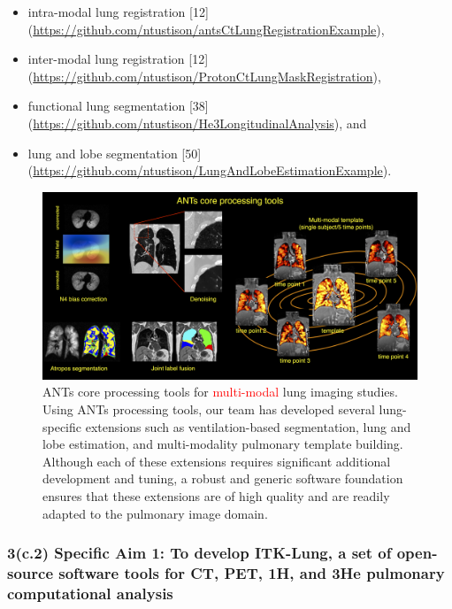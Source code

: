\documentclass[11pt,]{article}
\providecommand{\tightlist}{%
  \setlength{\itemsep}{0pt}\setlength{\parskip}{0pt}}
\begin{document}
\begin{itemize}
\tightlist
\item
  intra-modal lung registration {[}12{]}
  (\url{https://github.com/ntustison/antsCtLungRegistrationExample}),
\item
  inter-modal lung registration {[}12{]}
  (\url{https://github.com/ntustison/ProtonCtLungMaskRegistration}),
\item
  functional lung segmentation {[}38{]}
  (\url{https://github.com/ntustison/He3LongitudinalAnalysis}), and
\item
  lung and lobe segmentation {[}50{]}
  (\url{https://github.com/ntustison/LungAndLobeEstimationExample}).
\end{itemize}

\begin{figure}[htbp]
\centering
\includegraphics{Figs/coreANtsToolsLung.png}
\caption{ANTs core processing tools for \textcolor{red}{multi-modal}
lung imaging studies. Using ANTs processing tools, our team has
developed several lung-specific extensions such as ventilation-based
segmentation, lung and lobe estimation, and multi-modality pulmonary
template building. Although each of these extensions requires
significant additional development and tuning, a robust and generic
software foundation ensures that these extensions are of high quality
and are readily adapted to the pulmonary image domain.}
\end{figure}

\subsubsection{\texorpdfstring{3(c.2) \textbf{Specific Aim 1:} To
develop ITK-Lung, a set of open-source software tools for CT, PET, 1H,
and 3He pulmonary computational
analysis}{3(c.2) Specific Aim 1: To develop ITK-Lung, a set of open-source software tools for CT, PET, 1H, and 3He pulmonary computational analysis}}\label{c.2-specific-aim-1-to-develop-itk-lung-a-set-of-open-source-software-tools-for-ct-pet-1h-and-3he-pulmonary-computational-analysis}
\end{document}
